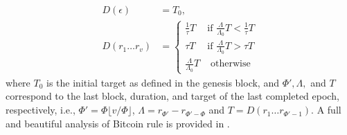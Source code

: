 \documentclass{article}
\begin{document}
\begin{align*}
    D(\epsilon) &= T_0,\\
    D(r_1 \ldots r_v) &= \left\{ \begin{array}{ll}
         \frac{1}{\tau}T& \text{if } \frac{\Lambda}{\Lambda_0}T < \frac{1}{\tau}T  \\
         \tau T&  \text{if } \frac{\Lambda}{\Lambda_0}T > {\tau}T \\
         \frac{\Lambda}{\Lambda_0}T & \text{ otherwise}
    \end{array}\right.
\end{align*}
where $T_0$ is the initial target as defined in the genesis block, and $\Phi' , \Lambda,$ and $T$ correspond to the last block, duration, and target of the last completed epoch, respectively, i.e., $\Phi' = \Phi \lfloor v/\Phi \rfloor$, $\Lambda = r_{\Phi'} - r_{\Phi' -\Phi}$ and $T = D(r_1 \ldots r_{\Phi'-1})$. A full and beautiful analysis of Bitcoin rule is provided in \cite{full2020}.





\end{document}
